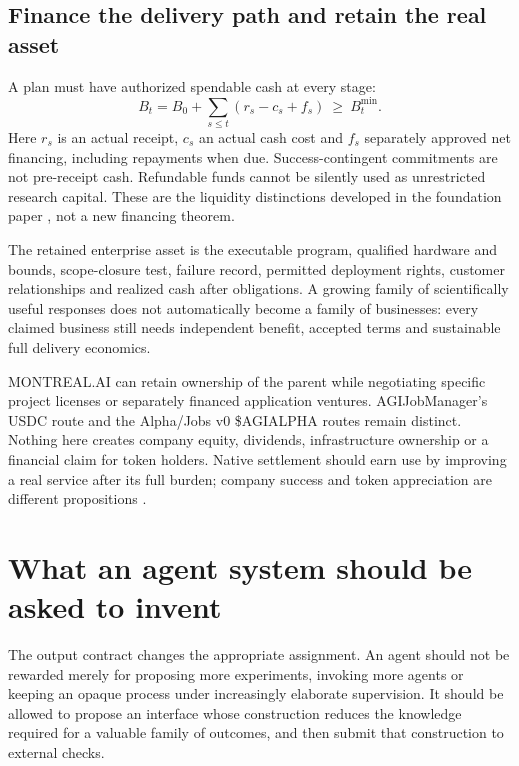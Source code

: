 \documentclass[11pt,letterpaper]{article}
\theoremstyle{definition}\newtheorem{definition}[theorem]{Definition}
\theoremstyle{remark}\newtheorem{remark}[theorem]{Remark}
\begin{document}
\subsection{Finance the delivery path and retain the real asset}
A plan must have authorized spendable cash at every stage:
\begin{equation}
 B_t=B_0+\sum_{s\leq t}(r_s-c_s+f_s)\ \geq\ B_t^{\min}.
 \label{eq:cash}
\end{equation}
Here $r_s$ is an actual receipt, $c_s$ an actual cash cost and $f_s$ separately approved net financing, including repayments when due. Success-contingent commitments are not pre-receipt cash. Refundable funds cannot be silently used as unrestricted research capital. These are the liquidity distinctions developed in the foundation paper \cite{boucherEconomy}, not a new financing theorem.

The retained enterprise asset is the executable program, qualified hardware and bounds, scope-closure test, failure record, permitted deployment rights, customer relationships and realized cash after obligations. A growing family of scientifically useful responses does not automatically become a family of businesses: every claimed business still needs independent benefit, accepted terms and sustainable full delivery economics.

MONTREAL.AI can retain ownership of the parent while negotiating specific project licenses or separately financed application ventures. AGIJobManager's USDC route and the Alpha/Jobs v0 \$AGIALPHA routes remain distinct. Nothing here creates company equity, dividends, infrastructure ownership or a financial claim for token holders. Native settlement should earn use by improving a real service after its full burden; company success and token appreciation are different propositions \cite{boucherEconomy,boucherBrief}.

\section{What an agent system should be asked to invent}
\label{sec:agents}
The output contract changes the appropriate assignment. An agent should not be rewarded merely for proposing more experiments, invoking more agents or keeping an opaque process under increasingly elaborate supervision. It should be allowed to propose an interface whose construction reduces the knowledge required for a valuable family of outcomes, and then submit that construction to external checks.
\end{document}
